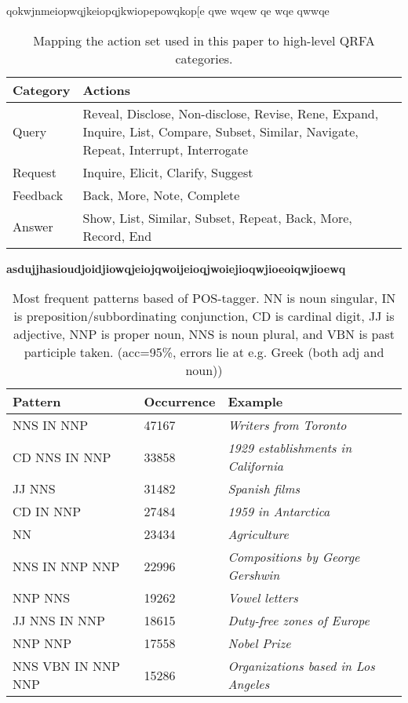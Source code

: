 qokwjnmeiopwqjkeiopqjkwiopepowqkop[e
qwe
wqew
qe
wqe
qwwqe



\begin{table}[t]
	\caption{Mapping the action set used in this paper to high-level QRFA categories.}
	\captionshrink
	\small
	\begin{tabular}{@{~}lp{6.7cm}}
	\toprule
	\textbf{Category} & \textbf{Actions} \\
	\midrule
	Query & Reveal, Disclose, Non-disclose, Revise, Rene, Expand, Inquire, List, Compare, Subset, Similar, Navigate, Repeat, Interrupt, Interrogate \\
	Request & Inquire, Elicit, Clarify, Suggest \\
	Feedback & Back, More, Note, Complete \\
	Answer & Show, List, Similar, Subset, Repeat, Back, More, Record, End \\
	\bottomrule
	\end{tabular}
\label{tbl:actions_qrfa}
\end{table}

\textbf{asdujjhasioudjoidjiowqjeiojqwoijeioqjwoiejioqwjioeoiqwjioewq}

\begin{table}[t]
\footnotesize
  \centering
  \caption{Most frequent patterns based of POS-tagger.
  NN is noun singular, IN is preposition/subbordinating conjunction, CD is cardinal digit, JJ is adjective, NNP is proper noun, NNS is noun plural, and VBN is past participle taken.  (acc=95\%, errors lie at e.g. Greek (both adj and noun))}
  \begin{tabular}{lll}
    \toprule
    Pattern & Occurrence & Example \\
    \midrule
    NNS IN NNP & 47167 & \emph{Writers from Toronto} \\
    CD NNS IN NNP & 33858 & \emph{1929 establishments in California} \\
    JJ NNS & 31482 & \emph{Spanish films} \\
    CD IN NNP & 27484 & \emph{1959 in Antarctica} \\
    NN & 23434 & \emph{Agriculture} \\
    NNS IN NNP NNP & 22996 & \emph{Compositions by George Gershwin}\\
    NNP NNS & 19262 & \emph{Vowel letters} \\
    JJ NNS IN NNP & 18615 & \emph{Duty-free zones of Europe} \\
    NNP NNP & 17558 & \emph{Nobel Prize} \\
    NNS VBN IN NNP NNP & 15286 & \emph{Organizations based in Los Angeles} \\
    \bottomrule
  \end{tabular}
  \label{tbl:pattern}
\end{table}
